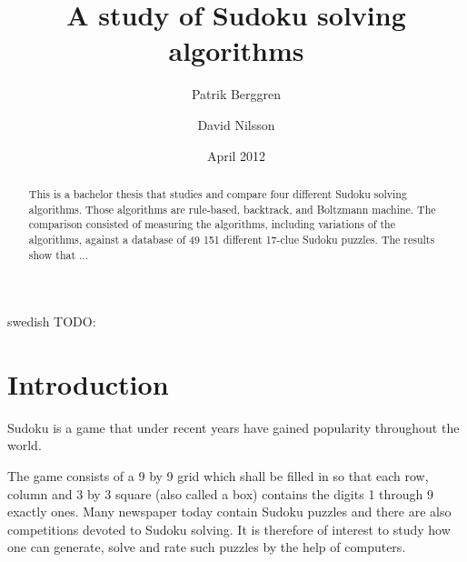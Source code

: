 \documentclass[a4paper,11pt]{kth-mag}
\title{A study of Sudoku solving algorithms}
\subtitle{}
\author{Patrik Berggren \and David Nilsson}
\date{April 2012}
\begin{document}
\frontmatter
\pagestyle{empty}
\removepagenumbers
\maketitle
{}
\begin{abstract}
This is a bachelor thesis that studies and compare four different Sudoku
solving algorithms.
Those algorithms are rule-based, backtrack, and Boltzmann machine.
 The comparison consisted of measuring the algorithms, including
variations of the algorithms, against a database of 49 151 different 17-clue Sudoku
puzzles.
The results show that ...
\end{abstract}
\clearpage
\begin{foreignabstract}{swedish}
TODO: 
\end{foreignabstract}
\clearpage
\tableofcontents*
\mainmatter
\pagestyle{newchap}

\chapter{Introduction}
Sudoku is a game that under recent years have gained popularity throughout the world.

The game consists of a 9 by 9 grid which shall be filled in so that each 
row, column and 3 by 3 square (also called a box) contains the digits 
1 through 9 exactly ones. 
Many newspaper today contain Sudoku puzzles and there are also competitions devoted 
to Sudoku solving.
It is therefore of interest to study how one can generate, 
solve and rate such puzzles by the help of computers.
\end{document}
